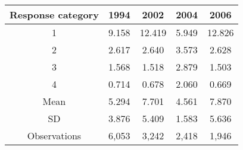 {
	\begin{threeparttable}
		\begin{tabular}{c c c c c}
			\toprule
			Response category & 1994 & 2002 & 2004 & 2006 \\
			\midrule
			1 & 9.158 & 12.419 & 5.949 & 12.826 \\
			2 & 2.617 & 2.640 & 3.573 & 2.628 \\
			3 & 1.568 & 1.518 & 2.879 & 1.503 \\
			4 & 0.714 & 0.678 & 2.060 &  0.669 \\
			\midrule
			Mean & 5.294 & 7.701 & 4.561 & 7.870 \\
			SD & 3.876 & 5.409 & 1.583 & 5.636 \\
			Observations & 6,053 & 3,242 & 2,418 & 1,946 \\
			\bottomrule
		\end{tabular}
	\end{threeparttable}
	
}